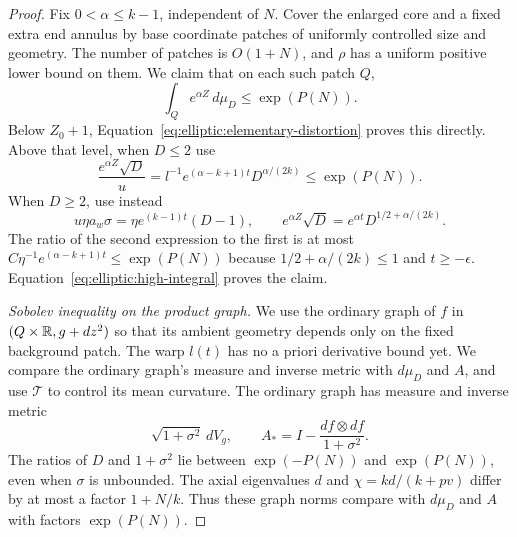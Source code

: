 \begin{proof}
Fix $0<\alpha\le k-1$, independent of $N$.  Cover the enlarged core
and a fixed extra end annulus by base coordinate patches of uniformly
controlled size and geometry.  The number of patches is $O(1+N)$,
and $\rho$ has a uniform positive lower bound on them.  We claim that
on each such patch $Q$,
\begin{equation}\label{eq:elliptic:initial-integral}
 \int_Q e^{\alpha Z}\,d\mu_D\le\exp(P(N)).
\end{equation}
Below $Z_0+1$, Equation~\eqref{eq:elliptic:elementary-distortion}
proves this directly.  Above that level, when $D\le2$ use
\[
 \frac{e^{\alpha Z}\sqrt D}{u}
   =l^{-1}e^{(\alpha-k+1)t}D^{\alpha/(2k)}
   \le\exp(P(N)).
\]
When $D\ge2$, use instead
\[
 u\eta a_w\sigma=\eta e^{(k-1)t}(D-1),\qquad
 e^{\alpha Z}\sqrt D=e^{\alpha t}D^{1/2+\alpha/(2k)}.
\]
The ratio of the second expression to the first is at most
$C\eta^{-1}e^{(\alpha-k+1)t}\le\exp(P(N))$ because
$1/2+\alpha/(2k)\le1$ and $t\ge-\epsilon$.
Equation~\eqref{eq:elliptic:high-integral} proves the claim.

\medskip\noindent\emph{Sobolev inequality on the product graph.}
We use the ordinary graph of $f$ in $(Q\times\mathbb R,g+dz^2)$ so that
its ambient geometry depends only on the fixed background patch.  The
warp $l(t)$ has no a priori derivative bound yet.  We compare the
ordinary graph's measure and inverse metric with $d\mu_D$ and $A$,
and use $\mathcal T$ to control its mean curvature.
The ordinary graph has measure and inverse metric
\[
 \sqrt{1+\sigma^2}\,dV_g,
 \qquad A_* = I-\frac{df\otimes df}{1+\sigma^2}.
\]
The ratios of $D$ and $1+\sigma^2$ lie between $\exp(-P(N))$ and
$\exp(P(N))$, even when $\sigma$ is unbounded.  The axial eigenvalues
$d$ and $\chi=kd/(k+pv)$ differ by at most a factor $1+N/k$.
Thus these graph norms compare with $d\mu_D$ and $A$ with factors
$\exp(P(N))$.


\end{proof}
